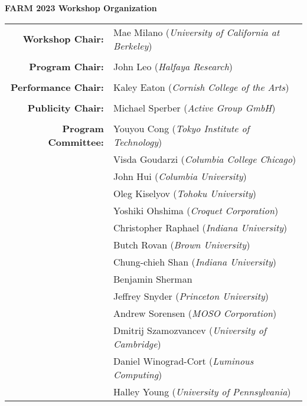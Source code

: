 \documentclass[sigplan]{acmart}
\begin{document}
\newpage

\begin{center}
{\bfseries \Huge FARM 2023 Workshop Organization}
\end{center}

\bigskip

\large
\begin{center}
\begin{tabular}{rl}

{\bf Workshop Chair:} & Mae Milano (\emph{University of California at Berkeley})\\
\\

{\bf Program Chair:} & John Leo (\emph{Halfaya Research})\\
\\

{\bf Performance Chair:} & Kaley Eaton (\emph{Cornish College of the Arts})\\
\\

{\bf Publicity Chair:} & Michael Sperber (\emph{Active Group GmbH})\\
\\
  
  {\bf Program Committee:}
  & Youyou	Cong	        (\emph{Tokyo Institute of Technology})\\
  & Visda	Goudarzi        (\emph{Columbia College Chicago})\\
  & John	Hui	        (\emph{Columbia University})\\
  & Oleg	Kiselyov	(\emph{Tohoku University})\\
  & Yoshiki	Ohshima	        (\emph{Croquet Corporation})\\
  & Christopher	Raphael	        (\emph{Indiana University})\\
  & Butch	Rovan	        (\emph{Brown University})\\
  & Chung-chieh	Shan	        (\emph{Indiana University})\\
  & Benjamin	Sherman\\
  & Jeffrey	Snyder	        (\emph{Princeton University})\\
  & Andrew	Sorensen	(\emph{MOSO Corporation})\\
  & Dmitrij	Szamozvancev	(\emph{University of Cambridge})\\
  & Daniel	Winograd-Cort	(\emph{Luminous Computing})\\
  & Halley	Young	        (\emph{University of Pennsylvania})\\
\end{tabular}
\end{center}

\vspace{2mm}
\end{document}

